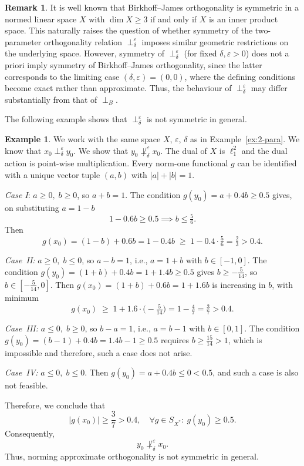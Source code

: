 \documentclass[11pt, reqno]{amsart}
\theoremstyle{definition}
\newtheorem{remark}[theorem]{Remark}
\newtheorem{example}[theorem]{Example}
\newcommand{\nperp}{\perp_{\delta}^\varepsilon}
\begin{document}
\begin{remark}
It is well known that Birkhoff--James orthogonality is symmetric in a normed linear space $X$ with $\dim X \geq 3$ if and only if $X$ is an inner product space. This naturally raises the question of whether symmetry of the two-parameter orthogonality relation $\nperp$ imposes similar geometric restrictions on the underlying space. However, symmetry of $\nperp$ (for fixed $\delta, \varepsilon > 0$) does not a priori imply symmetry of Birkhoff--James orthogonality, since the latter corresponds to the limiting case $(\delta,\varepsilon) = (0,0)$, where the defining conditions become exact rather than approximate. Thus, the behaviour of $\nperp$ may differ substantially from that of $\perp_B$.
\end{remark} 

\noindent The following example shows that $\nperp$ is not symmetric in general.

\begin{example}\label{ex:nonsym}
We work with the same space $X$, $\varepsilon$, $\delta$ as in Example~\ref{ex:2-para}. We know that $x_0 \perp_{\delta}^{\varepsilon} y_0$. We show that $y_0 \not\perp_{\delta}^{\varepsilon} x_0$. The dual of $X$ is $\ell_1^2$ and the dual action is point-wise multiplication. Every norm-one functional $g$ can be identified with a unique vector tuple $(a,b)$ with $|a|+|b|=1$. 

\medskip

\noindent\textit{Case I}: $a \geq 0,\; b \geq 0$, so $a + b = 1$.
The condition $g(y_0) = a + 0.4b \geq 0.5$ gives, on substituting 
$a = 1-b$
\[
1 - 0.6b \geq 0.5 \implies b \leq \tfrac{5}{6}.
\]
Then
\[
g(x_0) = (1-b) + 0.6b = 1 - 0.4b 
\;\geq\; 1 - 0.4 \cdot \tfrac{5}{6} = \tfrac{2}{3} > 0.4.
\]

\medskip

\noindent\textit{Case~II:} $a \geq 0,\; b \leq 0$, so $a - b = 1$, 
i.e., $a = 1+b$ with $b \in [-1,0]$.
The condition $g(y_0) = (1+b) + 0.4b = 1 + 1.4b \geq 0.5$ gives 
$b \geq -\frac{5}{14}$, so $b \in [-\frac{5}{14}, 0]$.
Then $g(x_0) = (1+b) + 0.6b = 1 + 1.6b$ is increasing in $b$, 
with minimum
\[
g(x_0) \;\geq\; 1 + 1.6\cdot\bigl(-\tfrac{5}{14}\bigr) 
= 1 - \tfrac{4}{7} = \tfrac{3}{7} > 0.4.
\]

\medskip
\noindent\textit{Case~III:} $a \leq 0,\; b \geq 0$, so $b - a = 1$, 
i.e., $a = b - 1$ with $b \in [0,1]$.
The condition $g(y_0) = (b-1) + 0.4b = 1.4b - 1 \geq 0.5$ requires 
$b \geq \frac{15}{14} > 1$, which is impossible and therefore, such a case does not arise.

\medskip

\noindent\textit{Case~IV:} $a \leq 0,\; b \leq 0$.
Then $g(y_0) = a + 0.4b \leq 0 < 0.5$, and such a case is also not feasible.

\medskip


\noindent Therefore, we conclude that
\[
|g(x_0)| \geq \frac{3}{7} > 0.4, \quad \forall g\in S_{X^*}:~g(y_0)\geq 0.5.
\]
Consequently,
\[
y_0\not\nperp x_0.
\]
Thus, norming approximate orthogonality is not symmetric in general.
\end{example}
\end{document}

